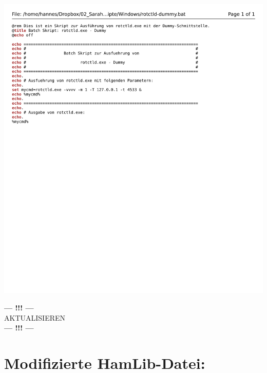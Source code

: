 \begin{center}
	\includegraphics[width=1\textwidth]{./appendicies/rotctld-dummy}
\end{center}

\begin{center}
	\Large{\textbf{--- !!! ---}\\AKTUALISIEREN\\\textbf{--- !!! ---}}
\end{center}


\chapter{Modifizierte HamLib-Datei: }
\label{chap:hamlibmodification}

